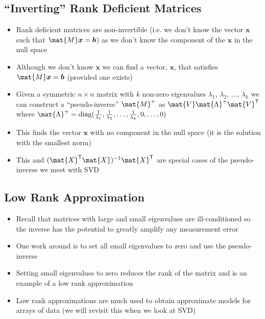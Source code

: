 \begin{slide}
\section[-2]{``Inverting'' Rank Deficient Matrices}

\begin{PauseHighLight}
  \begin{itemize}
  \item Rank deficient matrices are non-invertible (i.e. we don't know
    the vector $\bm{x}$ such that $\mat{M} \bm{x} = \bm{b}$) as we don't know
    the component of the $\bm{x}$ in the null space\pause
  \item Although we don't know $\bm{x}$ we can find a vector,
    $\bm{x}$, that satisfies $\mat{M} \bm{x} = \bm{b}$ (provided one
    exists)\pause
  \item Given a symmetric $n\times n$ matrix with $k$ non-zero eigenvalues
    $\lambda_1$, $\lambda_2$, $\ldots$, $\lambda_k$ we can construct
    a ``pseudo-inverse'' $\mat{M}^{+}$ as $\mat{V} \mat{\Lambda}^+
    \mat{V}^\tr$ where  $\mat{\Lambda}^{+} = \diag(\tfrac{1}{\lambda_1},
    \tfrac{1}{\lambda_2}, \ldots, \tfrac{1}{\lambda_k}, 0, \ldots,0)$\pause
  \item This finds the vector $\bm{x}$ with no component in the null
    space\pause{} (it is the solution with the smallest norm)\pauseb
  \item This and $(\mat{X}^\tr\mat{X})^{-1}\mat{X}^\tr$ are special
    cases of the pseudo-inverse we meet with SVD\pause
  \end{itemize}
\end{PauseHighLight}

\end{slide}


\begin{slide}
\section{Low Rank Approximation}

\begin{PauseHighLight}
  \begin{itemize}
  \item Recall that matrices with large and small eigenvalues are
    ill-conditioned so the inverse has the potential to greatly amplify any
    measurement error\pause
  \item One work around is to set all small eigenvalues to zero and
    use the pseudo-inverse\pause
  \item Setting small eigenvalues to zero reduces the rank of the
    matrix and is an example of a low rank approximation\pause
  \item Low rank approximations are much used to obtain approximate
    models for arrays of data\pause{} (we will revisit this when we look at SVD)\pauseb
  \end{itemize}
\end{PauseHighLight}

\end{slide}

